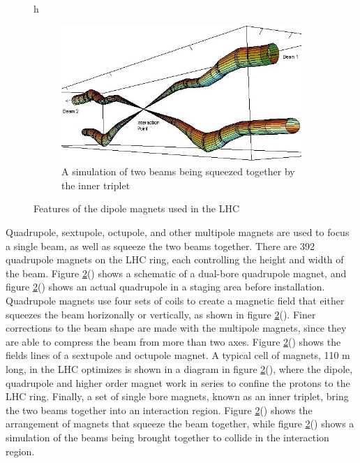 \begin{figure}{h}
      \begin{subfigure}[h]{0.450\textwidth}
        \includegraphics[width=\textwidth]{Figures/LHC_Diagrams/LHC_InteractionRegion.jpg}
        \caption{A simulation of two beams being squeezed together by
          the inner triplet \cite{LHC:LHC_lhc_IR_schematic_image}}\label{fig:lhc_beam_squeeze}
      \end{subfigure}
       \caption{Features of the dipole magnets used in the LHC}\label{fig:lhc_multipole}
\end{figure}


\par Quadrupole, sextupole, octupole, and other multipole magnets are
used to focus a single beam, as well as squeeze the two beams
together.  There are 392 quadrupole magnets
on the LHC ring, each controlling the height and width of the beam.
Figure \ref{fig:lhc_multipole}() shows a
schematic of a dual-bore quadrupole magnet, and figure
\ref{fig:lhc_multipole}() shows an
actual quadrupole in a staging area before  installation.  Quadrupole
magnets use four sets of coils to create a magnetic field that either
squeezes the beam horizonally or vertically, as shown in figure
\ref{fig:lhc_multipole}(). Finer
corrections to the beam shape are made with the multipole magnets,
since they are able to compress the beam from more than two axes.
Figure \ref{fig:lhc_multipole}()
shows the fields lines of a sextupole and  octupole magnet.  A typical
cell of magnets, 110 m long, in the LHC optimizes is shown in a diagram
in figure \ref{fig:lhc_multipole}(), where the dipole, 
quadrupole and higher order magnet work in series to confine the
protons to the LHC ring.  Finally, a set of single bore magnets, known
as an inner triplet, bring the two beams together into an interaction
region.  Figure
\ref{fig:lhc_multipole}() shows the
arrangement of magnets that squeeze the beam together, while figure
\ref{fig:lhc_multipole}() shows a
simulation of the beams being brought together to collide in the
interaction region.  


